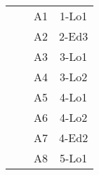 \begin{longtable}[c]{cccc}
\multicolumn{1}{|c|}{}                                    & \multicolumn{1}{c|}{}                                                                                                                          & \multicolumn{1}{c|}{\cellcolor[HTML]{80EDF3}A1}    & \multicolumn{1}{c|}{1-Lo1}                               \\ \cline{3-4} 
\multicolumn{1}{|c|}{}                                    & \multicolumn{1}{c|}{}                                                                                                                          & \multicolumn{1}{c|}{\cellcolor[HTML]{34CDF9}A2}    & \multicolumn{1}{c|}{2-Ed3}                               \\ \cline{3-4} 
\multicolumn{1}{|c|}{}                                    & \multicolumn{1}{c|}{}                                                                                                                          & \multicolumn{1}{c|}{\cellcolor[HTML]{80EDF3}A3}    & \multicolumn{1}{c|}{3-Lo1}                               \\ \cline{3-4} 
\multicolumn{1}{|c|}{}                                    & \multicolumn{1}{c|}{}                                                                                                                          & \multicolumn{1}{c|}{\cellcolor[HTML]{34CDF9}A4}    & \multicolumn{1}{c|}{3-Lo2}                               \\ \cline{3-4} 
\multicolumn{1}{|c|}{}                                    & \multicolumn{1}{c|}{}                                                                                                                          & \multicolumn{1}{c|}{\cellcolor[HTML]{80EDF3}A5}    & \multicolumn{1}{c|}{4-Lo1}                               \\ \cline{3-4} 
\multicolumn{1}{|c|}{}                                    & \multicolumn{1}{c|}{}                                                                                                                          & \multicolumn{1}{c|}{\cellcolor[HTML]{34CDF9}A6}    & \multicolumn{1}{c|}{4-Lo2}                               \\ \cline{3-4} 
\multicolumn{1}{|c|}{}                                    & \multicolumn{1}{c|}{}                                                                                                                          & \multicolumn{1}{c|}{\cellcolor[HTML]{80EDF3}A7}    & \multicolumn{1}{c|}{4-Ed2}                               \\ \cline{3-4} 
\multicolumn{1}{|c|}{}                                    & \multicolumn{1}{c|}{}                                                                                                                          & \multicolumn{1}{c|}{\cellcolor[HTML]{34CDF9}A8}    & \multicolumn{1}{c|}{5-Lo1}                               \\ \cline{3-4} 

\end{longtable}
